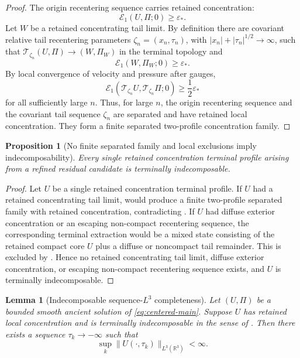 \documentclass[11pt]{amsart}
\numberwithin{equation}{section}
\theoremstyle{plain}
\newtheorem{proposition}[theorem]{Proposition}
\newtheorem{lemma}[theorem]{Lemma}
\theoremstyle{definition}
\theoremstyle{remark}
\newcommand{\R}{\mathbb R}
\newcommand{\eps}{\varepsilon}
\newcommand{\calE}{\mathcal E}
\begin{document}
\begin{proof}
The origin recentering sequence carries retained concentration:
\[
   \calE_1(U,\Pi;0)\ge\eps_*.
\]
Let \(W\) be a retained concentrating tail limit.  By definition there are
covariant relative tail recentering parameters
\(\zeta_n=(x_n,\tau_n)\), with
\(|x_n|+|\tau_n|^{1/2}\to\infty\), such that
\(\mathscr T_{\zeta_n}(U,\Pi)\to(W,\Pi_W)\) in the terminal topology and
\[
   \calE_1(W,\Pi_W;0)\ge\eps_*.
\]
By local convergence of velocity and pressure after gauges,
\[
   \calE_1(\mathscr T_{\zeta_n}U,\mathscr T_{\zeta_n}\Pi;0)
   \ge\frac12\eps_*
\]
for all sufficiently large \(n\).  Thus, for large \(n\), the origin
recentering sequence and the covariant tail sequence \(\zeta_n\) are separated
and have retained local concentration.
They form a finite separated two-profile concentration family.
\end{proof}

\begin{proposition}[No finite separated family and local exclusions imply indecomposability]
\label{prop:no-multi-implies-atomic}
Every single retained concentration terminal profile arising from a refined
residual candidate is terminally indecomposable.
\end{proposition}

\begin{proof}
Let \(U\) be a single retained concentration terminal profile.  If \(U\) had a
retained concentrating tail limit,  would
produce a finite two-profile separated family with retained concentration, contradicting
.  If \(U\) had diffuse exterior
concentration or an escaping non-compact recentering sequence, the corresponding
terminal extraction would be a mixed state consisting of the retained compact
core \(U\) plus a diffuse or noncompact tail remainder.  This is excluded by
.  Hence no retained concentrating tail
limit, diffuse exterior concentration, or escaping non-compact recentering
sequence exists, and \(U\) is terminally indecomposable.
\end{proof}

\begin{lemma}[Indecomposable sequence-\(L^3\) completeness]
\label{lem:atomic-sequence-L3}
Let \((U,\Pi)\) be a bounded smooth ancient solution of
\eqref{eq:centered-main}.  Suppose \(U\) has retained local concentration and
is terminally indecomposable in the sense of
.  Then there exists a sequence
\(\tau_k\to-\infty\) such that
\[
   \sup_k\|U(\cdot,\tau_k)\|_{L^3(\R^3)}<\infty .
\]
\end{lemma}
\end{document}
